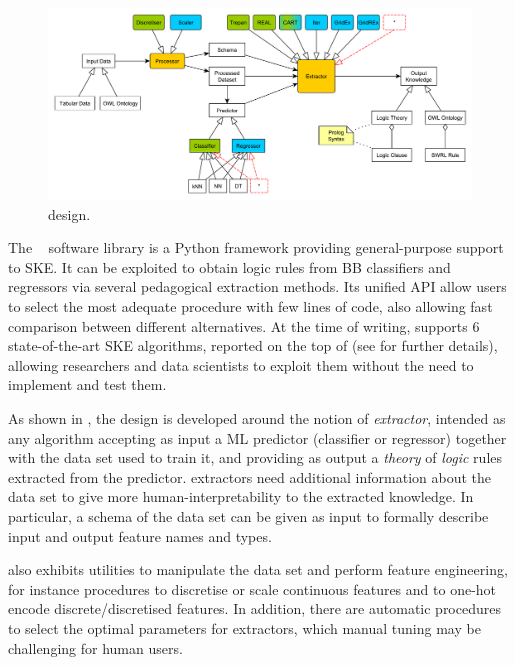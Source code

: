 \documentclass[
]{ceurart}
\begin{document}
\subsection{\psyke}

\begin{figure}
\centering
	\includegraphics[width=\linewidth]{figures/Psyke.pdf}
	\caption{\psyke{} design.}
\end{figure}



The \psyke{}~\cite{psyke-woa2021,psyke-ia2022} software library is a Python framework providing general-purpose support to SKE.
%
It can be exploited to obtain logic rules from BB classifiers and regressors via several pedagogical extraction methods.
%
Its unified API allow users to select the most adequate procedure with few lines of code, also allowing fast comparison between different alternatives.
%
At the time of writing, \psyke{} supports 6 state-of-the-art SKE algorithms, reported on the top of  (see  for further details), allowing researchers and data scientists to exploit them without the need to implement and test them.

As shown in , the \psyke{} design is developed around the notion of \emph{extractor}, intended as any algorithm accepting as input a ML predictor (classifier or regressor) together with the data set used to train it, and providing as output a \emph{theory} of \emph{logic} rules extracted from the predictor.
%
\psyke{} extractors need additional information about the data set to give more human-interpretability to the extracted knowledge.
In particular, a schema of the data set can be given as input to formally describe input and output feature names and types.

\psyke{} also exhibits utilities to manipulate the data set and perform feature engineering, for instance procedures to discretise or scale continuous features and to one-hot encode discrete/discretised features.
%
In addition, there are automatic procedures to select the optimal parameters for extractors, which manual tuning may be challenging for human users.
\end{document}
